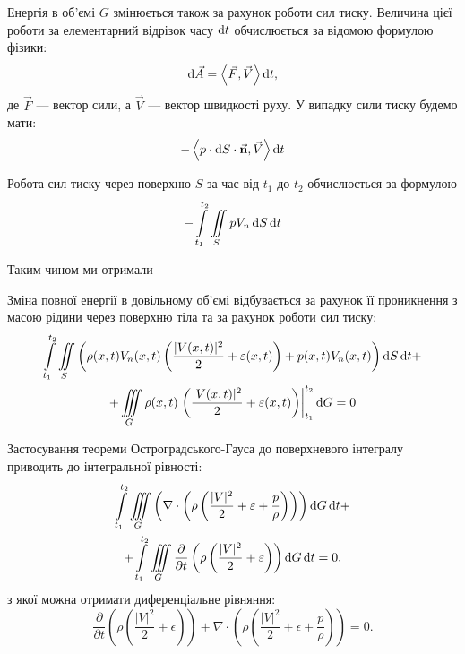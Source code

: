 Енергія в об'ємі $G$ змінюється також за рахунок роботи сил тиску. Величина цієї роботи за елементарний відрізок часу $\mathop{}\!\mathrm{d} t$ обчислюється за відомою формулою фізики:
\begin{equation}
	\diff \vec A = \langle \vec F, \vec V \rangle \diff t,
\end{equation}
де $\vec F$ --- вектор сили, а $\vec V$ --- вектор швидкості руху. У випадку сили тиску будемо мати:
\begin{equation}
	- \langle p \cdot \diff S \cdot \vec{\bf{n}}, \vec V \rangle \diff t
\end{equation}

Робота сил тиску через поверхню $S$ за час від $t_1$ до $t_2$ обчислюється за формулою
\begin{equation}
	- \displaystyle\int\limits_{t_1}^{t_2} \displaystyle\iint\limits_S  p  V_n \mathop{}\!\mathrm{d} S \mathop{}\!\mathrm{d} t
\end{equation}

Таким чином ми отримали
\begin{law}
	\label{laq:full-energy-conservation}
	Зміна повної енергії в довільному об'ємі відбувається за рахунок її проникнення з масою рідини через поверхню тіла та за рахунок роботи сил тиску:
	\begin{multline}
		\displaystyle\int\limits_{t_1}^{t_2} \displaystyle\iint\limits_S \left( \rho(x, t) V_n(x, t) \left( \frac{|V(x, t)|^2}{2} + \varepsilon(x, t) \right) + p(x, t) V_n(x, t) \right) \mathop{}\!\mathrm{d} S \mathop{}\!\mathrm{d} t + \\
		+ \displaystyle\iiint\limits_G \rho(x, t) \left. \left( \frac{|V(x, t)|^2}{2} + \varepsilon(x, t) \right) \right|_{t_1}^{t_2} \mathop{}\!\mathrm{d} G = 0
	\end{multline}
\end{law}

Застосування теореми Остроградського-Гауса до поверхневого інтегралу приводить до інтегральної рівності:
\begin{multline}
	\displaystyle\int\limits_{t_1}^{t_2} \displaystyle\iiint\limits_G \left(\nabla \cdot \left( \rho \left( \frac{|V|^2}{2} + \varepsilon + \frac{p}{\rho} \right) \right)\right) \mathop{}\!\mathrm{d} G \mathop{}\!\mathrm{d} t + \\
	+ \displaystyle\int\limits_{t_1}^{t_2} \displaystyle\iiint\limits_G \frac{\partial}{\partial t} \left( \rho \left( \frac{|V|^2}{2} + \varepsilon \right) \right) \mathop{}\!\mathrm{d} G \mathop{}\!\mathrm{d} t = 0.
\end{multline}
з якої можна отримати диференціальне рівняння:
\begin{equation}
	\frac{\partial}{\partial t} \left( \rho \left( \frac{|V|^2}{2} + \epsilon \right) \right) +\nabla \cdot \left( \rho \left( \frac{|V|^2}{2} + \epsilon + \frac{p}{\rho} \right) \right) = 0.
\end{equation}

